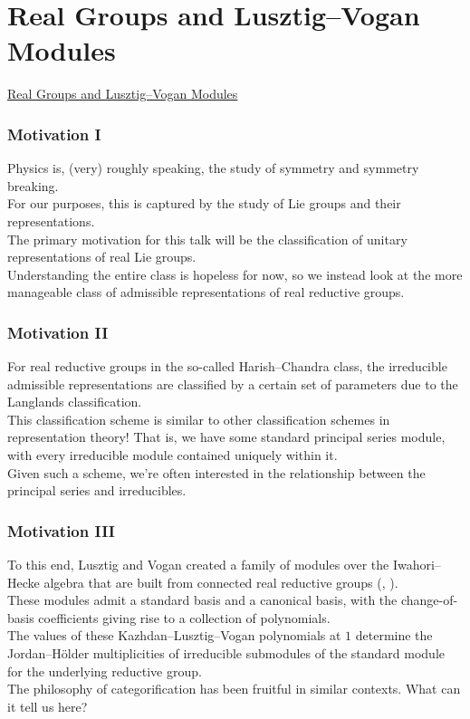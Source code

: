 \documentclass{beamer}
\begin{document}
\section{Real Groups and Lusztig--Vogan Modules}

\begin{frame}
\noindent\centerline{\LARGE\textcolor{structure}{\underline{Real Groups and Lusztig--Vogan Modules}}}
\end{frame}

\begin{frame}
\frametitle{Motivation I}
Physics is, (very) roughly speaking, the study of symmetry and symmetry breaking.\\[2ex]

For our purposes, this is captured by the study of Lie groups and their representations.\\[2ex]

The primary motivation for this talk will be the classification of unitary representations of real Lie groups.\\[2ex]

Understanding the entire class is hopeless for now, so we instead look at the more manageable class of \textcolor{structure}{admissible representations of real reductive groups}.
\end{frame}

\begin{frame}
\frametitle{Motivation II}
For real reductive groups in the so-called \textcolor{structure}{Harish--Chandra class}, the irreducible admissible representations are classified by a certain set of parameters due to the \textcolor{structure}{Langlands classification}.\\[2ex]

This classification scheme is similar to other classification schemes in representation theory! That is, we have some standard principal series module, with every irreducible module contained uniquely within it.\\[2ex]

Given such a scheme, we're often interested in the relationship between the principal series and irreducibles.
\end{frame}

\begin{frame}
\frametitle{Motivation III}
To this end, Lusztig and Vogan created a family of modules over the Iwahori--Hecke algebra that are built from connected real reductive groups (\cite{Vog82}, \cite{LV83}).\\[2ex]

These modules admit a standard basis and a canonical basis, with the change-of-basis coefficients giving rise to a collection of polynomials.\\[2ex]

The values of these \textcolor{structure}{Kazhdan--Lusztig--Vogan polynomials} at $1$ determine the Jordan–H\"{o}lder multiplicities of irreducible submodules of the standard module for the underlying reductive group.\\[2ex]

The philosophy of categorification has been fruitful in similar contexts. What can it tell us here?
\end{frame}
\end{document}
